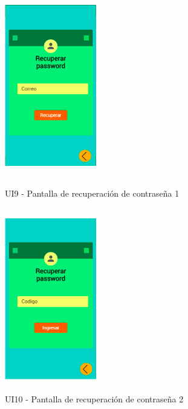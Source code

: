 \begin{figure}[h!]
	\begin{minipage}{0.48\textwidth}
		\centering
		\includegraphics[width=4cm,height=8cm]{imagenes/Anexos/Mockup/9-RecuperarP.png}
		\caption{UI9 - Pantalla de recuperación de contraseña 1}
		\label{fig:analogo}
	\end{minipage}\hfill
	\begin{minipage}{0.48\textwidth}
		\centering
		\includegraphics[width=4cm,height=8cm]{imagenes/Anexos/Mockup/10-RecuperarP2.png}
		\caption{UI10 - Pantalla de recuperación de contraseña 2}
		\label{fig:analogo}
	\end{minipage}\hfill
\end{figure}

